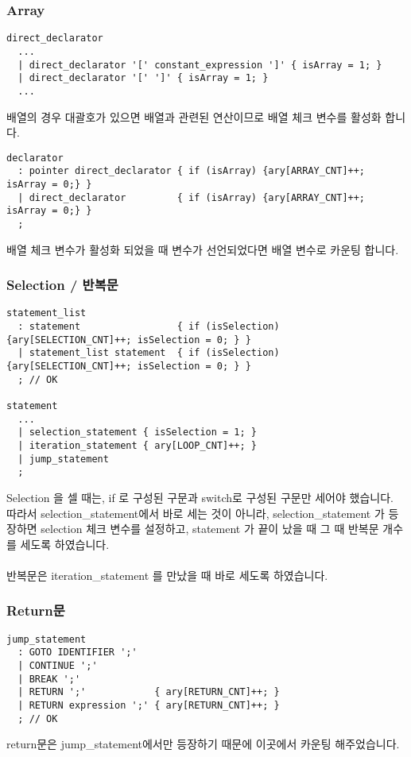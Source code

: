 \documentclass{article}
\begin{document}
\subsubsection{Array}
\begin{verbatim}
direct_declarator
  ...
  | direct_declarator '[' constant_expression ']' { isArray = 1; }
  | direct_declarator '[' ']' { isArray = 1; }
  ...
\end{verbatim}
배열의 경우 대괄호가 있으면 배열과 관련된 연산이므로 배열 체크 변수를 활성화 합니다.
\begin{verbatim}
declarator
  : pointer direct_declarator { if (isArray) {ary[ARRAY_CNT]++; isArray = 0;} }
  | direct_declarator         { if (isArray) {ary[ARRAY_CNT]++; isArray = 0;} }
  ;
\end{verbatim}
배열 체크 변수가 활성화 되었을 때 변수가 선언되었다면 배열 변수로 카운팅 합니다.

\subsubsection{Selection / 반복문}
\begin{verbatim}
statement_list
  : statement                 { if (isSelection) {ary[SELECTION_CNT]++; isSelection = 0; } }
  | statement_list statement  { if (isSelection) {ary[SELECTION_CNT]++; isSelection = 0; } }
  ; // OK

statement
  ...
  | selection_statement { isSelection = 1; }
  | iteration_statement { ary[LOOP_CNT]++; }
  | jump_statement
  ;
\end{verbatim}

Selection 을 셀 때는, if 로 구성된 구문과 switch로 구성된 구문만 세어야 했습니다.\\
따라서 selection\_statement에서 바로 세는 것이 아니라, selection\_statement 가 등장하면 selection 체크 변수를 설정하고, statement 가 끝이 났을 때 그 때 반복문 개수를 세도록 하였습니다.\\\\
반복문은 iteration\_statement 를 만났을 때 바로 세도록 하였습니다.
\subsubsection{Return문}
\begin{verbatim}
jump_statement
  : GOTO IDENTIFIER ';'
  | CONTINUE ';'
  | BREAK ';'
  | RETURN ';'            { ary[RETURN_CNT]++; }
  | RETURN expression ';' { ary[RETURN_CNT]++; }
  ; // OK
\end{verbatim}
return문은 jump\_statement에서만 등장하기 때문에 이곳에서 카운팅 해주었습니다.
\end{document}
